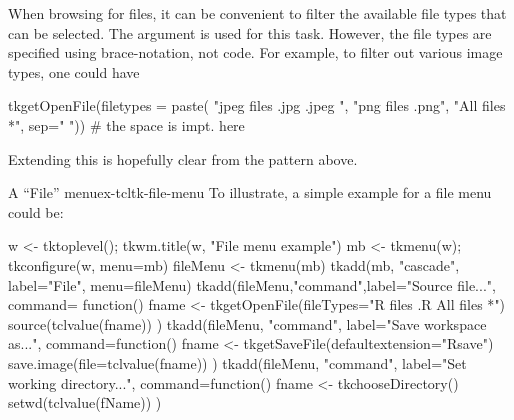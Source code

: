 When browsing for files, it can be convenient to filter the available
file types that can be selected. The  argument is used for this task. However,
the file types are specified using \TCL\/ brace-notation, not \R\/ code. For example,
to filter out various image types, one could have 
\begin{Schunk}
\begin{Sinput}
 tkgetOpenFile(filetypes = paste(
                 "{{jpeg files} {.jpg .jpeg} }",
                 "{{png files} {.png}}",
                 "{{All files} {*}}", sep=" ")) # the space is impt. here
\end{Sinput}
\end{Schunk}
Extending this is hopefully clear from the pattern above.

\begin{example}{A ``File'' menu}{ex-tcltk-file-menu}
  To illustrate, a simple example for a file menu could be:
\begin{Schunk}
\begin{Sinput}
 w <- tktoplevel(); tkwm.title(w, "File menu example")
 mb <- tkmenu(w); tkconfigure(w, menu=mb)
 fileMenu <- tkmenu(mb)
 tkadd(mb, "cascade", label="File", menu=fileMenu)
 tkadd(fileMenu,"command",label="Source file...",
       command= function() {
         fname <- tkgetOpenFile(fileTypes="{{R files} {.R}} {{All files} *}")
         source(tclvalue(fname))
       })
 tkadd(fileMenu, "command", label="Save workspace as...",
       command=function() {
         fname <- tkgetSaveFile(defaultextension="Rsave")
         save.image(file=tclvalue(fname))
       })
 tkadd(fileMenu, "command", label="Set working directory...",
       command=function() {
         fname <- tkchooseDirectory()
         setwd(tclvalue(fName))
       })
\end{Sinput}
\end{Schunk}
\end{example}


